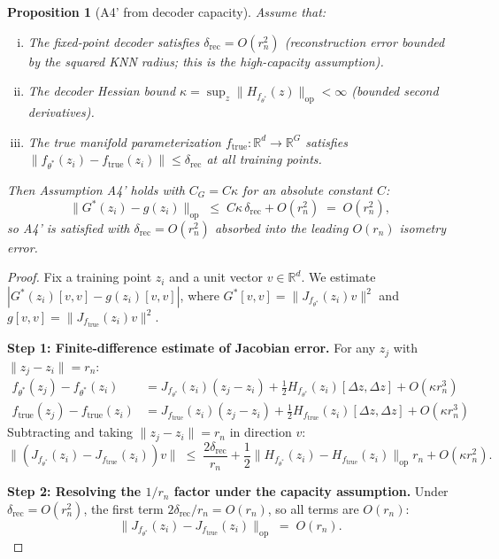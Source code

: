 \documentclass[11pt]{article}
\newtheorem{proposition}{Proposition}
\newcommand{\R}{\mathbb{R}}
\begin{document}
\begin{bridgebox}
\begin{proposition}[A4' from decoder capacity]\label{prop:a4prime}
Assume that:
\begin{enumerate}[(i)]
\item The fixed-point decoder satisfies $\delta_{\mathrm{rec}} = O(r_n^2)$
  (reconstruction error bounded by the squared KNN radius; this is the
  \emph{high-capacity assumption}).
\item The decoder Hessian bound $\kappa = \sup_z \|H_{f_{\theta^*}}(z)\|_{\mathrm{op}}
  < \infty$ (bounded second derivatives).
\item The true manifold parameterization $f_{\mathrm{true}}: \R^d \to \R^G$
  satisfies $\|f_{\theta^*}(z_i) - f_{\mathrm{true}}(z_i)\| \le
  \delta_{\mathrm{rec}}$ at all training points.
\end{enumerate}
Then Assumption A4' holds with $C_G = C\kappa$ for an absolute constant $C$:
\[
    \|G^*(z_i) - g(z_i)\|_{\mathrm{op}}
    \;\le\; C\kappa\,\delta_{\mathrm{rec}} + O(r_n^2)
    \;=\; O(r_n^2),
\]
so A4' is satisfied with $\delta_{\mathrm{rec}} = O(r_n^2)$ absorbed into
the leading $O(r_n)$ isometry error.
\end{proposition}

\begin{proof}
Fix a training point $z_i$ and a unit vector $v \in \R^d$. We estimate
$|G^*(z_i)[v,v] - g(z_i)[v,v]|$, where $G^*[v,v] = \|J_{f_{\theta^*}}(z_i) v\|^2$
and $g[v,v] = \|J_{f_{\mathrm{true}}}(z_i) v\|^2$.

\textbf{Step 1: Finite-difference estimate of Jacobian error.}
For any $z_j$ with $\|z_j - z_i\| = r_n$:
\begin{align*}
    f_{\theta^*}(z_j) - f_{\theta^*}(z_i)
    &= J_{f_{\theta^*}}(z_i)(z_j - z_i) + \tfrac{1}{2} H_{f_{\theta^*}}(z_i)[\Delta z, \Delta z]
    + O(\kappa r_n^3) \\
    f_{\mathrm{true}}(z_j) - f_{\mathrm{true}}(z_i)
    &= J_{f_{\mathrm{true}}}(z_i)(z_j - z_i) + \tfrac{1}{2} H_{f_{\mathrm{true}}}(z_i)[\Delta z, \Delta z]
    + O(\kappa r_n^3)
\end{align*}
Subtracting and taking $\|z_j - z_i\| = r_n$ in direction $v$:
\[
    \|(J_{f_{\theta^*}}(z_i) - J_{f_{\mathrm{true}}}(z_i))v\|
    \;\le\; \frac{2\delta_{\mathrm{rec}}}{r_n} + \frac{1}{2}\|H_{f_{\theta^*}}(z_i) - H_{f_{\mathrm{true}}}(z_i)\|_{\mathrm{op}} r_n
    + O(\kappa r_n^2).
\]

\textbf{Step 2: Resolving the $1/r_n$ factor under the capacity assumption.}
Under $\delta_{\mathrm{rec}} = O(r_n^2)$, the first term $2\delta_{\mathrm{rec}}/r_n = O(r_n)$,
so all terms are $O(r_n)$:
\[
    \|J_{f_{\theta^*}}(z_i) - J_{f_{\mathrm{true}}}(z_i)\|_{\mathrm{op}}
    \;=\; O(r_n).
\]


\end{proof}
\end{bridgebox}
\end{document}
